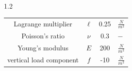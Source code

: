 \documentclass[preview]{standalone}
\begin{document}
\begin{spacing}{1.2}
\begin{tabular}{cccl}
\toprule
Lagrange multiplier & $\ell$ & 0.25 & $\frac{N}{m^2}$ \\ 
Poisson's ratio & $\nu$ & 0.3 & $-$ \\ 
Young's modulus & $E$ & 200 & $\frac{N}{m^2}$ \\ 
vertical load component & $f$ & -10 & $\frac{N}{m^2}$ \\ 
\bottomrule
\end{tabular}
\end{spacing}
\end{document}
